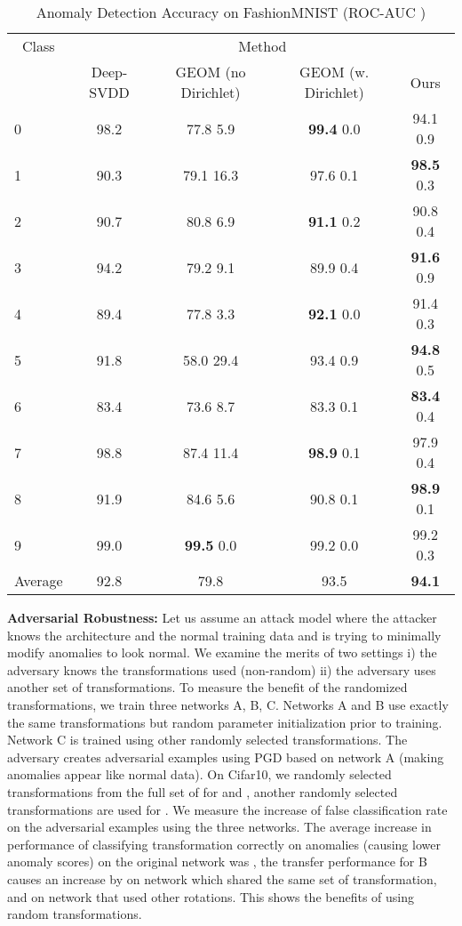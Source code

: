 \documentclass{article} \usepackage{iclr2020_conference,times}
\begin{document}
\begin{table}[t]
  \centering
      
  \caption{Anomaly Detection Accuracy on FashionMNIST (ROC-AUC )}
  \label{tab:exp_small_fashion}

    \begin{tabular}{lcccc}
    \toprule      

    \multicolumn{1}{c}{Class} & \multicolumn{4}{c}{Method} \\
   & Deep-SVDD & GEOM (no Dirichlet) &GEOM (w. Dirichlet) & Ours \\
    \midrule
   0 & 98.2  & 77.8  5.9 & \textbf{99.4}  0.0 & 94.1  0.9\\
   1 & 90.3 & 79.1  16.3 & 97.6  0.1 & \textbf{98.5}  0.3\\
   2 & 90.7 & 80.8  6.9 & \textbf{91.1}  0.2 & 90.8  0.4 \\
   3 & 94.2  & 79.2  9.1 & 89.9  0.4 & \textbf{91.6}  0.9\\
   4 & 89.4  & 77.8  3.3 & \textbf{92.1}  0.0 & 91.4  0.3\\
   5 & 91.8 &  58.0  29.4 & 93.4  0.9 & \textbf{94.8}  0.5\\
   6 &  83.4  & 73.6  8.7 & 83.3  0.1 & \textbf{83.4}  0.4\\
   7 & 98.8 & 87.4  11.4 & \textbf{98.9}  0.1 & 97.9  0.4\\
   8 & 91.9  & 84.6  5.6 & 90.8  0.1 &\textbf{ 98.9}  0.1\\
   9 & 99.0  & \textbf{99.5}  0.0 & 99.2  0.0 & 99.2  0.3\\
   \midrule
   Average & 92.8 & 79.8 & 93.5 & \textbf{94.1} \\
	 \bottomrule
    \end{tabular}

\end{table}

\textbf{Adversarial Robustness:} Let us assume an attack model where the attacker knows the architecture and the normal training data and is trying to minimally modify anomalies to look normal. We examine the merits of two settings i) the adversary knows the transformations used (non-random) ii) the adversary uses another set of transformations. To measure the benefit of the randomized transformations, we train three networks A, B, C. Networks A and B use exactly the same transformations but random parameter initialization prior to training. Network C is trained using other randomly selected transformations. The adversary creates adversarial examples using PGD \citep{madry2017towards} based on network A (making anomalies appear like normal data). On Cifar10, we randomly selected  transformations from the full set of  for  and , another randomly selected  transformations are used for . We measure the increase of false classification rate on the adversarial examples using the three networks. The average increase in performance of classifying transformation correctly on anomalies (causing lower anomaly scores) on the original network  was , the transfer performance for B causes an increase by  on network  which shared the same set of transformation, and  on network  that used other rotations. This shows the benefits of using random transformations. 
\end{document}
